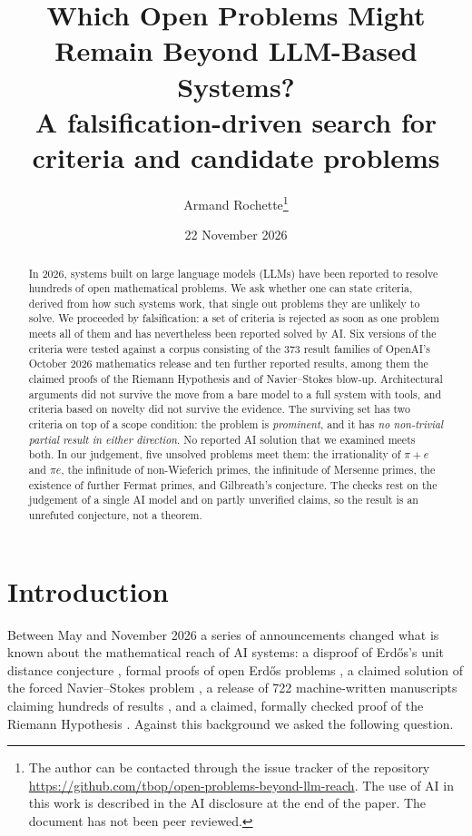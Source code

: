 \documentclass[11pt,a4paper]{article}
\title{\textbf{Which Open Problems Might Remain Beyond LLM-Based Systems?}\\[6pt]
\large A falsification-driven search for criteria and candidate problems}
\author{Armand Rochette\thanks{The author can be contacted through the issue tracker of the repository \url{https://github.com/tbop/open-problems-beyond-llm-reach}. The use of AI in this work is described in the AI disclosure at the end of the paper. The document has not been peer reviewed.}}
\date{22 November 2026}
\theoremstyle{prob}
\begin{document}
\maketitle

\begin{abstract}
\noindent In 2026, systems built on large language models (LLMs) have been reported to resolve hundreds of open mathematical problems. We ask whether one can state criteria, derived from how such systems work, that single out problems they are unlikely to solve. We proceeded by falsification: a set of criteria is rejected as soon as one problem meets all of them and has nevertheless been reported solved by AI. Six versions of the criteria were tested against a corpus consisting of the 373 result families of OpenAI's October 2026 mathematics release and ten further reported results, among them the claimed proofs of the Riemann Hypothesis and of Navier--Stokes blow-up. Architectural arguments did not survive the move from a bare model to a full system with tools, and criteria based on novelty did not survive the evidence. The surviving set has two criteria on top of a scope condition: the problem is \emph{prominent}, and it has \emph{no non-trivial partial result in either direction}. No reported AI solution that we examined meets both. In our judgement, five unsolved problems meet them: the irrationality of $\pi+e$ and $\pi e$, the infinitude of non-Wieferich primes, the infinitude of Mersenne primes, the existence of further Fermat primes, and Gilbreath's conjecture. The checks rest on the judgement of a single AI model and on partly unverified claims, so the result is an unrefuted conjecture, not a theorem.
\end{abstract}

\section{Introduction}

Between May and November 2026 a series of announcements changed what is known about the mathematical reach of AI systems: a disproof of Erd\H{o}s's unit distance conjecture \cite{udopenai,udremarks}, formal proofs of open Erd\H{o}s problems \cite{nexus}, a claimed solution of the forced Navier--Stokes problem \cite{nsopenai}, a release of 722 machine-written manuscripts claiming hundreds of results \cite{openairelease}, and a claimed, formally checked proof of the Riemann Hypothesis \cite{rhscience}. Against this background we asked the following question.
\end{document}
